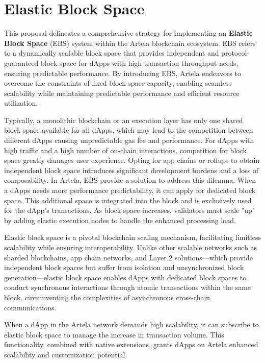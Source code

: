 \section{Elastic Block Space}

This proposal delineates a comprehensive strategy for implementing an \textbf{Elastic Block Space} (EBS) system within the Artela blockchain ecosystem. EBS refers to a dynamically scalable block space that provides independent and protocol-guaranteed block space for dApps with high transaction throughput needs, ensuring predictable performance. By introducing EBS, Artela endeavors to overcome the constraints of fixed block space capacity, enabling seamless scalability while maintaining predictable performance and efficient resource utilization.

Typically, a monolithic blockchain or an execution layer has only one shared block space available for all dApps, which may lead to the competition between different dApps causing unpredictable gas fee and performance. For dApps with high traffic and a high number of on-chain interactions, competition for block space greatly damages user experience. Opting for app chains or rollups to obtain independent block space introduces significant development burdens and a loss of composability. In Artela, EBS provide a solution to address this dilemma. When a dApps needs more performance predictability, it can apply for  dedicated block space. This additional space is integrated into the block and is exclusively used for the dApp's transactions. As block space increases, validators must scale "up" by adding elastic execution nodes to handle the enhanced processing load.

Elastic block space is a pivotal blockchain scaling mechanism, facilitating limitless scalability while ensuring interoperability. Unlike other scalable networks such as sharded blockchains, app chain networks, and Layer 2 solutions—which provide independent block spaces but suffer from isolation and unsynchronized block generation—elastic block space enables dApps with dedicated block spaces to conduct synchronous interactions through atomic transactions within the same block, circumventing the complexities of asynchronous cross-chain communications.

When a dApp in the Artela network demands high scalability, it can subscribe to elastic block space to manage the increase in transaction volume. This functionality, combined with native extensions, grants dApps on Artela enhanced scalability and customization potential.

